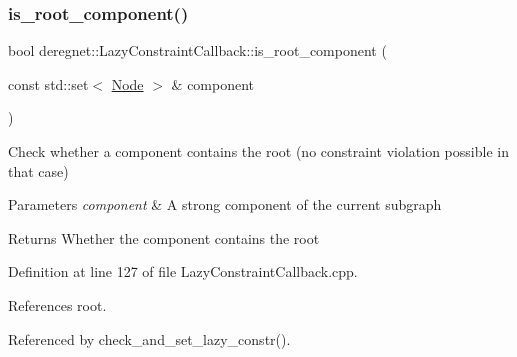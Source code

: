 \subsubsection{\texorpdfstring{is\+\_\+root\+\_\+component()}{is\_root\_component()}}
{\footnotesize\ttfamily bool deregnet\+::\+Lazy\+Constraint\+Callback\+::is\+\_\+root\+\_\+component (\begin{DoxyParamCaption}\item[{const std\+::set$<$ \hyperlink{namespacederegnet_a744bad34f2de9856d36715a445f027f3}{Node} $>$ \&}]{component }\end{DoxyParamCaption})\hspace{0.3cm}{\ttfamily [private]}}



Check whether a component contains the root (no constraint violation possible in that case) 


\begin{DoxyParams}{Parameters}
{\em component} & A strong component of the current subgraph\\
\hline
\end{DoxyParams}
\begin{DoxyReturn}{Returns}
Whether the component contains the root 
\end{DoxyReturn}


Definition at line 127 of file Lazy\+Constraint\+Callback.\+cpp.



References root.



Referenced by check\+\_\+and\+\_\+set\+\_\+lazy\+\_\+constr().


